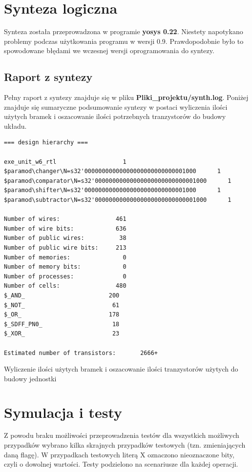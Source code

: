 \documentclass[12pt]{article}
\begin{document}
	\section*{Synteza logiczna}
	Synteza została przeprowadzona w programie \textbf{yosys 0.22}. Niestety napotykano problemy podczas użytkowania programu w wersji 0.9. Prawdopodobnie było to spowodowane błędami we wczesnej wersji oprogramowania do syntezy.
	\subsection*{Raport z syntezy}
	Pełny raport z syntezy znajduje się w pliku \textbf{Pliki\_projektu/synth.log}. Poniżej znajduje się sumaryczne podsumowanie syntezy w postaci wyliczenia ilości użytych bramek i oszacowanie ilości potrzebnych tranzystorów do budowy układu. 
	
	\begin{program}
		\begin{verbatim}
=== design hierarchy ===

exe_unit_w6_rtl                   1
$paramod\changer\N=s32'00000000000000000000000000001000      1
$paramod\comparator\N=s32'00000000000000000000000000001000      1
$paramod\shifter\N=s32'00000000000000000000000000001000      1
$paramod\subtractor\N=s32'00000000000000000000000000001000      1

Number of wires:                461
Number of wire bits:            636
Number of public wires:          38
Number of public wire bits:     213
Number of memories:               0
Number of memory bits:            0
Number of processes:              0
Number of cells:                480
$_AND_                        200
$_NOT_                         61
$_OR_                         178
$_SDFF_PN0_                    18
$_XOR_                         23

Estimated number of transistors:       2666+
		\end{verbatim}
		\caption*{Wyliczenie ilości użytych bramek i oszacowanie ilości tranzystorów użytych do budowy jednostki}
		\label{code:output}
	\end{program}
\vspace{-20pt}
	
	\section*{Symulacja i testy}
	
	Z powodu braku możliwości przeprowadzenia testów dla wszystkich możliwych przypadków wybrano kilka skrajnych przypadków testowych (tzn. zmieniających daną flagę). W przypadkach testowych literą X oznaczono nieoznaczone bity, czyli o dowolnej wartości.  Testy podzielono na scenariusze dla każdej operacji. 
	
\end{document}

